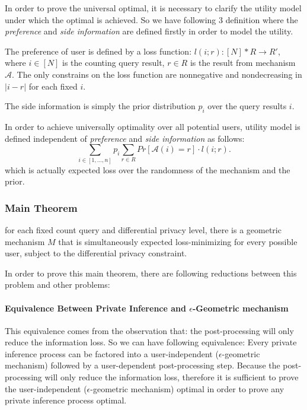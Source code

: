 \documentclass{article}
\begin{document}
%
In order to prove the universal optimal, it is necessary to clarify the utility model under which the optimal is achieved. 
So we have following 3 definition where 
the \emph{preference} and \emph{side information} are defined firstly in order to model the utility.
%
\begin{defn}[preference]
The preference of user is defined by a loss function: $l(i; r): [N] * R \rightarrow R'$,
where $i \in [N]$ is the counting query result, $r \in R$ is the result from mechanism $\mathcal{A}$.
The only constrains on the loss function are nonnegative and nondecreasing in $|i - r|$ for each fixed $i$. 
\end{defn}

\begin{defn}
The side information is simply the prior distribution $p_i$ over the query results $i$.
\end{defn}

\begin{defn}
In order to achieve universally optimality over all potential users, utility model is defined independent
of \emph{preference} and \emph{side information} as follows:
\[
\sum_{i \in [1,\ldots, n]}p_i \sum_{r \in R}
Pr[\mathcal{A}(i) = r] \cdot l(i;r).
\]
which is actually expected loss over the randomness of the mechanism and the prior.
%
\end{defn}
%
%
%
%
\subsubsection{Main Theorem}
%
\begin{thm}
for each fixed count query and differential privacy level,
there is a geometric mechanism 
$M$ that is simultaneously expected loss-minimizing for every possible user,
subject to the differential privacy constraint.
\end{thm}
%
In order to prove this main theorem, there are following reductions between this problem and other problems:
\paragraph{Equivalence Between Private Inference and $\epsilon$-Geometric mechanism}
%
This equivalence comes from the observation that: the post-processing will only reduce the information loss.
So we can have following equivalence:
Every private inference process can be factored into a user-independent ($\epsilon$-geometric mechanism) followed by a user-dependent post-processing step.
Because the post-processing will only reduce the information loss, 
therefore it is sufficient to prove the user-independent ($\epsilon$-geometric mechanism) 
optimal in order to prove any private inference process optimal. 
\end{document}

